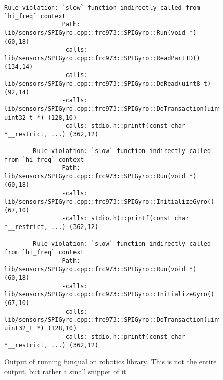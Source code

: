 \begin{figure}
    \begin{lstlisting}[gobble=8]
        Rule violation: `slow` function indirectly called from `hi_freq` context
                Path:   lib/sensors/SPIGyro.cpp::frc973::SPIGyro::Run(void *) (60,18)
                -calls: lib/sensors/SPIGyro.cpp::frc973::SPIGyro::ReadPartID() (134,14)
                -calls: lib/sensors/SPIGyro.cpp::frc973::SPIGyro::DoRead(uint8_t) (92,14)
                -calls: lib/sensors/SPIGyro.cpp::frc973::SPIGyro::DoTransaction(uint32_t, uint32_t *) (128,10)
                -calls: stdio.h::printf(const char *__restrict, ...) (362,12)

        Rule violation: `slow` function indirectly called from `hi_freq` context
                Path:   lib/sensors/SPIGyro.cpp::frc973::SPIGyro::Run(void *) (60,18)
                -calls: lib/sensors/SPIGyro.cpp::frc973::SPIGyro::InitializeGyro() (67,10)
                -calls: stdio.h)::printf(const char *__restrict, ...) (362,12)

        Rule violation: `slow` function indirectly called from `hi_freq` context
                Path:   lib/sensors/SPIGyro.cpp::frc973::SPIGyro::Run(void *) (60,18)
                -calls: lib/sensors/SPIGyro.cpp::frc973::SPIGyro::InitializeGyro() (67,10)
                -calls: lib/sensors/SPIGyro.cpp::frc973::SPIGyro::DoTransaction(uint32_t, uint32_t *) (128,10)
                -calls: stdio.h::printf(const char *__restrict, ...) (362,12)
    \end{lstlisting}
    \caption{Output of running funqual on robotics library.  This is not the entire output, but rather a small snippet of it}
    \label{lst:app:blocking:output}
\end{figure}
